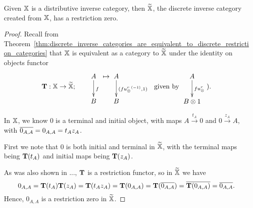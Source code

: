 \begin{lemma}\label{lem:x_tilde_has_a_restriction_zero}
  Given $\mathbb{X}$ is a distributive inverse category, then $\widetilde{\mathbb{X}}$, the discrete inverse category created
  from $\mathbb{X}$, has a restriction zero.
\end{lemma}
\begin{proof}
  Recall from Theorem~\ref{thm:discrete_inverse_categories_are_equivalent_to_discrete_restriction_categories}
  that $\mathbb{X}$ is equivalent as a category to $\widetilde{\mathbb{X}}$ under the identity on objects
  functor
  \[
    {\raisebox{-15pt}{$\wtf:\X \to \Xt;$}} \qquad \xymatrix{A\ar[d]^{f}\\B}\mapsto \xymatrix{A\ar[d]^{(f\inv{\usr},1)}\\B}
    \ \raisebox{-15pt}{ given by }\xymatrix{A\ar[d]^{f\usr}\\B\*1}\raisebox{-15pt}{).}
  \]

  In $\mathbb{X}$, we know $0$ is a terminal and initial object, with maps
  $A \xrightarrow{t_A} 0 $ and $0 \xrightarrow{z_A} A$, with $\overline{0_{A,A}} = 0_{A,A} = t_A z_A$.

  First we note that $0$ is both initial and terminal in $\widetilde{\mathbb{X}}$, with the terminal maps being
  $\mathbf{T}(t_A)$ and initial maps being $\mathbf{T}(z_A)$.

  As was also shown in ..., $\mathbf{T}$ is a restriction functor, so in $\widetilde{\mathbb{X}}$ we have
  \[
    0_{A,A} = \mathbf{T}(t_A)\mathbf{T}(z_A) = \mathbf{T}(t_A z_A) = \mathbf{T}(0_{A,A}) = \mathbf{T}(\overline{0_{A,A}}) =
    \overline{\mathbf{T}(0_{A,A})} = \overline{0_{A,A}}.
  \]
  Hence, $0_{A,A}$ is a restriction zero in $\widetilde{\mathbb{X}}$.
\end{proof}

